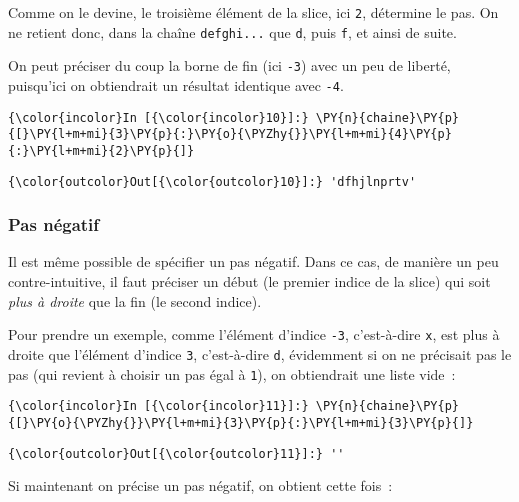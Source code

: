     Comme on le devine, le troisième élément de la slice, ici \texttt{2},
détermine le pas. On ne retient donc, dans la chaîne \texttt{defghi...}
que \texttt{d}, puis \texttt{f}, et ainsi de suite.

On peut préciser du coup la borne de fin (ici \texttt{-3}) avec un peu
de liberté, puisqu'ici on obtiendrait un résultat identique avec
\texttt{-4}.

    \begin{Verbatim}[commandchars=\\\{\}]
{\color{incolor}In [{\color{incolor}10}]:} \PY{n}{chaine}\PY{p}{[}\PY{l+m+mi}{3}\PY{p}{:}\PY{o}{\PYZhy{}}\PY{l+m+mi}{4}\PY{p}{:}\PY{l+m+mi}{2}\PY{p}{]}
\end{Verbatim}


\begin{Verbatim}[commandchars=\\\{\}]
{\color{outcolor}Out[{\color{outcolor}10}]:} 'dfhjlnprtv'
\end{Verbatim}
            
    \hypertarget{pas-nuxe9gatif}{%
\subsubsection{Pas négatif}\label{pas-nuxe9gatif}}

    Il est même possible de spécifier un pas négatif. Dans ce cas, de
manière un peu contre-intuitive, il faut préciser un début (le premier
indice de la slice) qui soit \emph{plus à droite} que la fin (le second
indice).

Pour prendre un exemple, comme l'élément d'indice \texttt{-3},
c'est-à-dire \texttt{x}, est plus à droite que l'élément d'indice
\texttt{3}, c'est-à-dire \texttt{d}, évidemment si on ne précisait pas
le pas (qui revient à choisir un pas égal à \texttt{1}), on obtiendrait
une liste vide~:

    \begin{Verbatim}[commandchars=\\\{\}]
{\color{incolor}In [{\color{incolor}11}]:} \PY{n}{chaine}\PY{p}{[}\PY{o}{\PYZhy{}}\PY{l+m+mi}{3}\PY{p}{:}\PY{l+m+mi}{3}\PY{p}{]}
\end{Verbatim}


\begin{Verbatim}[commandchars=\\\{\}]
{\color{outcolor}Out[{\color{outcolor}11}]:} ''
\end{Verbatim}
            
    Si maintenant on précise un pas négatif, on obtient cette fois~:

